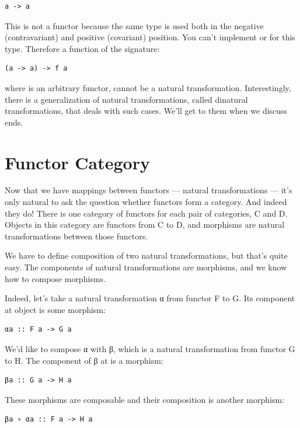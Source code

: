 \begin{verbatim}
a -> a
\end{verbatim}

This is not a functor because the same type  is used both in
the negative (contravariant) and positive (covariant) position. You
can't implement  or  for this type.
Therefore a function of the signature:

\begin{verbatim}
(a -> a) -> f a
\end{verbatim}

where  is an arbitrary functor, cannot be a natural
transformation. Interestingly, there is a generalization of natural
transformations, called dinatural transformations, that deals with such
cases. We'll get to them when we discuss ends.

\section{Functor Category}\label{functor-category}

Now that we have mappings between functors --- natural transformations
--- it's only natural to ask the question whether functors form a
category. And indeed they do! There is one category of functors for each
pair of categories, C and D. Objects in this category are functors from
C to D, and morphisms are natural transformations between those
functors.

We have to define composition of two natural transformations, but that's
quite easy. The components of natural transformations are morphisms, and
we know how to compose morphisms.

Indeed, let's take a natural transformation α from functor F to G. Its
component at object  is some morphism:

\begin{verbatim}
αa :: F a -> G a
\end{verbatim}

We'd like to compose α with β, which is a natural transformation from
functor G to H. The component of β at  is a morphism:

\begin{verbatim}
βa :: G a -> H a
\end{verbatim}

These morphisms are composable and their composition is another
morphism:

\begin{verbatim}
βa ∘ αa :: F a -> H a
\end{verbatim}

